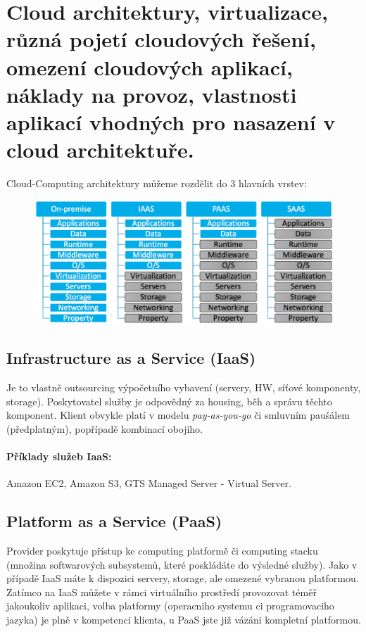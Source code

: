 \setcounter{section}{18}
\section[WA2 - Cloud]{Cloud architektury, virtualizace, různá pojetí cloudových řešení, omezení cloudových aplikací, náklady na provoz, vlastnosti aplikací vhodných pro nasazení v cloud architektuře.}


Cloud-Computing architektury můžeme rozdělit do 3 hlavních vrstev:

\begin{figure}[h!]
\centering
\includegraphics[width=140mm]{19/images/cloud-types}
\end{figure}


\subsection{Infrastructure as a Service (IaaS)}
Je to vlastně outsourcing výpočetního vybavení (servery, HW, síťové komponenty, storage). Poskytovatel služby je odpovědný za housing, běh a správu těchto komponent. Klient obvykle platí v modelu \textit{pay-as-you-go} či smluvním paušálem (předplatným), popřípadě kombinací obojího.
\paragraph{Příklady služeb IaaS:} Amazon EC2, Amazon S3, GTS Managed Server - Virtual Server.

\subsection{Platform as a Service (PaaS)}
Provider poskytuje přístup ke computing platformě či computing stacku (množina softwarových subsystemů, které poskládáte do výsledné služby). Jako v případě IaaS máte k dispozici servery, storage, ale omezené vybranou platformou. Zatímco na IaaS můžete v rámci virtuálního prostředí provozovat téměř jakoukoliv aplikaci, volba platformy (operacniho systemu ci programovaciho jazyka) je plně v kompetenci klienta, u PaaS jste již vázáni kompletní platformou.

